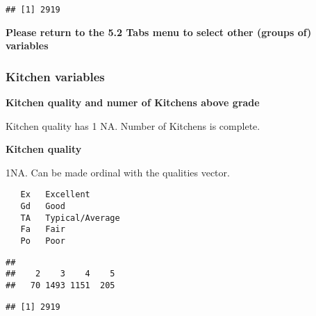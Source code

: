 \documentclass[]{article}
\newenvironment{Shaded}{\begin{snugshade}}{\end{snugshade}}
\newcommand{\KeywordTok}[1]{\textcolor[rgb]{0.13,0.29,0.53}{\textbf{#1}}}
\newcommand{\StringTok}[1]{\textcolor[rgb]{0.31,0.60,0.02}{#1}}
\newcommand{\CommentTok}[1]{\textcolor[rgb]{0.56,0.35,0.01}{\textit{#1}}}
\newcommand{\OperatorTok}[1]{\textcolor[rgb]{0.81,0.36,0.00}{\textbf{#1}}}
\newcommand{\NormalTok}[1]{#1}
\begin{document}
\begin{verbatim}
## [1] 2919
\end{verbatim}

\textbf{Please return to the 5.2 Tabs menu to select other (groups of)
variables}

\subsubsection{Kitchen variables}\label{kitchen-variables}

\textbf{Kitchen quality and numer of Kitchens above grade}

Kitchen quality has 1 NA. Number of Kitchens is complete.

\textbf{Kitchen quality}

1NA. Can be made ordinal with the qualities vector.

\begin{verbatim}
   Ex   Excellent
   Gd   Good
   TA   Typical/Average
   Fa   Fair
   Po   Poor
\end{verbatim}

\begin{Shaded}
\end{Shaded}

\begin{verbatim}
## 
##    2    3    4    5 
##   70 1493 1151  205
\end{verbatim}

\begin{Shaded}
\end{Shaded}

\begin{verbatim}
## [1] 2919
\end{verbatim}
\end{document}

